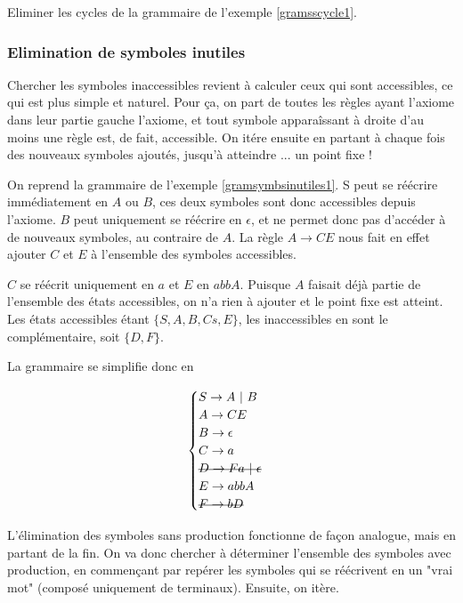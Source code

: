 \begin{exercice}
Eliminer les cycles de la grammaire de l'exemple \ref{gramsscycle1}.
\end{exercice}

\subsubsection{Elimination de symboles inutiles}

Chercher  les symboles inaccessibles revient à calculer ceux qui sont accessibles, ce qui est plus simple et naturel. Pour ça, on part de toutes les règles ayant l'axiome dans leur partie gauche l'axiome, et tout symbole apparaîssant à droite d'au moins une règle est, de fait, accessible. On itére ensuite en partant à chaque fois des nouveaux symboles ajoutés, jusqu'à atteindre ... un point fixe !

\begin{example}
On reprend la grammaire de l'exemple \ref{gramsymbsinutiles1}.
S peut se réécrire immédiatement en $A$ ou $B$, ces deux symboles sont donc accessibles depuis l'axiome. $B$ peut uniquement se réécrire en $\epsilon$, et ne permet donc pas d'accéder à de nouveaux symboles, au contraire de $A$. La règle $A \rightarrow CE$ nous fait en effet ajouter $C$ et $E$ à l'ensemble des symboles accessibles.

$C$ se réécrit uniquement en $a$ et $E$ en $abbA$. Puisque $A$ faisait déjà partie de l'ensemble des états accessibles, on n'a rien à ajouter et le point fixe est atteint. Les états accessibles étant $\{S,A,B,Cs,E\}$, les inaccessibles en sont le complémentaire, soit $\{D,F\}$.

La grammaire se simplifie donc en 

\[
\begin{cases}
S \rightarrow A~|~B \\
A \rightarrow CE \\
B \rightarrow \epsilon \\
C \rightarrow a \\
\text{\st{$D \rightarrow Fa~|~\epsilon$}} \\
E \rightarrow abbA \\
\text{\st{$F \rightarrow bD$}}
\end{cases}
\]

\end{example}

L'élimination des symboles sans production fonctionne de façon analogue, mais en partant de la fin. On va donc chercher à déterminer l'ensemble des symboles avec production, en commençant par repérer les symboles qui se réécrivent en un "vrai mot" (composé uniquement de terminaux). Ensuite, on itère.


